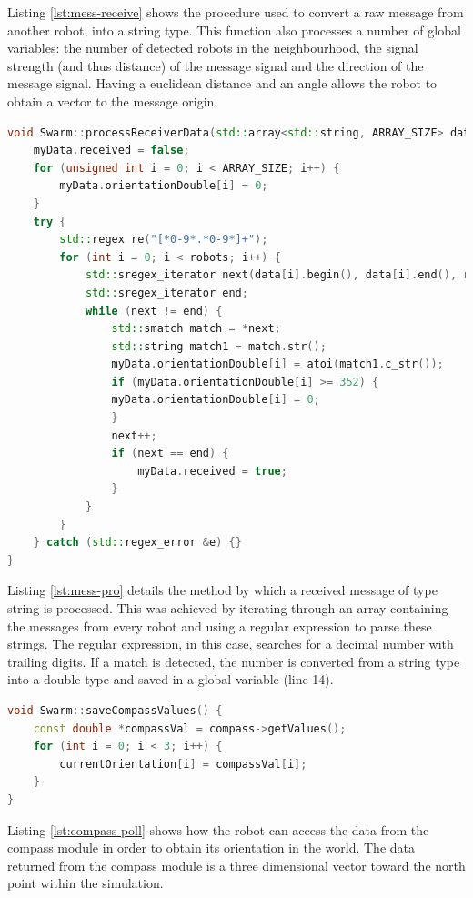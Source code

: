 Listing \ref{lst:mess-receive} shows the procedure used to convert a raw message from another robot, into a string type. This function also processes a number of global variables: the number of detected robots in the neighbourhood, the signal strength (and thus distance) of the message signal and the direction of the message signal. Having a euclidean distance and an angle allows the robot to obtain a vector to the message origin.

\clearpage

\begin{lstlisting}[language=C++, caption={Message processing},label={lst:mess-pro}]
void Swarm::processReceiverData(std::array<std::string, ARRAY_SIZE> data) {
	myData.received = false;
	for (unsigned int i = 0; i < ARRAY_SIZE; i++) {
		myData.orientationDouble[i] = 0;
	}
	try {
		std::regex re("[*0-9*.*0-9*]+");
		for (int i = 0; i < robots; i++) {
			std::sregex_iterator next(data[i].begin(), data[i].end(), re);
			std::sregex_iterator end;
			while (next != end) {
				std::smatch match = *next;
				std::string match1 = match.str();
				myData.orientationDouble[i] = atoi(match1.c_str());
				if (myData.orientationDouble[i] >= 352) {
				myData.orientationDouble[i] = 0;
				}
				next++;
				if (next == end) {
					myData.received = true;
				}
			}
		}
	} catch (std::regex_error &e) {}
}
\end{lstlisting}

Listing \ref{lst:mess-pro} details the method by which a received message of type string is processed. This was achieved by iterating through an array containing the messages from every robot and using a regular expression to parse these strings. The regular expression, in this case, searches for a decimal number with trailing digits. If a match is detected, the number is converted from a string type into a double type and saved in a global variable (line 14).


\begin{lstlisting}[language=C++, caption={Getting orientation data},label={lst:compass-poll}]
void Swarm::saveCompassValues() {
	const double *compassVal = compass->getValues();
	for (int i = 0; i < 3; i++) {
		currentOrientation[i] = compassVal[i];
	}
}
\end{lstlisting}

Listing \ref{lst:compass-poll} shows how the robot can access the data from the compass module in order to obtain its orientation in the world. The data returned from the compass module is a three dimensional vector toward the north point within the simulation.

